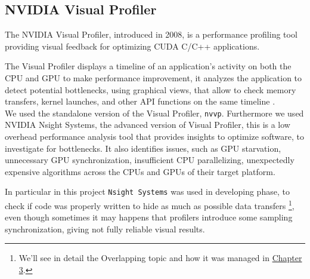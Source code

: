 	\subsection{NVIDIA Visual Profiler}
	The NVIDIA Visual Profiler, introduced in 2008, is a performance profiling tool providing visual feedback for optimizing CUDA C/C++ applications.
	
	The Visual Profiler displays a timeline of an application's activity on both the CPU and GPU to make performance improvement, it analyzes the application to detect potential bottlenecks, using graphical views, that allow to check memory transfers, kernel launches, and other API functions on the same timeline \cite{profilersguide}.\\
	 
	We used the standalone version of the Visual Profiler, \texttt{nvvp}. 
	Furthermore we used NVIDIA Nsight Systems, the advanced version of Visual Profiler, this is a low overhead performance analysis tool that provides insights to optimize software, to investigate for bottlenecks. It also identifies issues, such as GPU starvation, unnecessary GPU synchronization, insufficient CPU parallelizing, unexpectedly expensive algorithms across the CPUs and GPUs of their target platform. 
	 
	In particular in this project \texttt{Nsight Systems} was used in developing phase, to check if code was properly written to hide as much as possible data transfers \footnote{We'll see in detail the Overlapping topic and how it was managed in \hyperref[chap:logic]{Chapter 3}.}, even though sometimes it may happens that profilers introduce some sampling synchronization, giving not fully reliable visual results.
	

